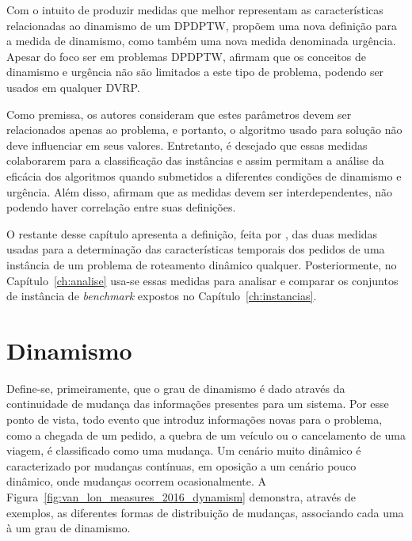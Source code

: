 Com o intuito de produzir medidas que melhor representam as características
relacionadas ao dinamismo de um DPDPTW,  
propõem uma nova definição para a medida de dinamismo, como também uma nova
medida denominada urgência.
Apesar do foco ser em problemas DPDPTW, 
afirmam que os conceitos de dinamismo e urgência não são limitados a este tipo
de problema, podendo ser usados em qualquer DVRP.

Como premissa, os autores consideram que estes parâmetros devem ser 
relacionados apenas ao problema, e portanto, o algoritmo usado para solução 
não deve influenciar em seus valores.
Entretanto, é desejado que essas medidas colaborarem para a classificação das 
instâncias e assim permitam a análise da eficácia dos algoritmos quando 
submetidos a diferentes condições de dinamismo e urgência. 
Além disso,  afirmam que as medidas devem ser 
interdependentes, não podendo haver correlação entre suas definições. 

O restante desse capítulo apresenta a definição, feita por
, das duas medidas usadas para a determinação
das características temporais dos pedidos de uma instância de um problema de 
roteamento dinâmico qualquer.
Posteriormente, no Capítulo~\ref{ch:analise} usa-se essas medidas para analisar
e comparar os conjuntos de instância de \textit{benchmark} expostos no 
Capítulo~\ref{ch:instancias}.






\section{Dinamismo}\label{sec:dinamismo}
Define-se, primeiramente, que o grau de dinamismo é dado através da 
continuidade de mudança das informações presentes para um sistema. 
Por esse ponto de vista, todo evento que introduz informações novas para o 
problema, como a chegada de um pedido, a quebra de um veículo ou o cancelamento
de uma viagem, é classificado como uma mudança.
Um cenário muito dinâmico é caracterizado por mudanças contínuas, em oposição a
um cenário pouco dinâmico, onde mudanças ocorrem ocasionalmente.
A Figura~\ref{fig:van_lon_measures_2016_dynamism} demonstra, 
através de exemplos, as diferentes formas de distribuição de mudanças,
associando cada uma à um grau de dinamismo.

